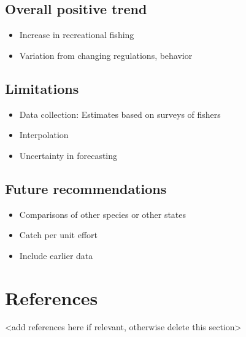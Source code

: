 \documentclass[
  12pt,
]{article}
\providecommand{\tightlist}{%
  \setlength{\itemsep}{0pt}\setlength{\parskip}{0pt}}
\begin{document}
\hypertarget{overall-positive-trend}{%
\subsection{Overall positive trend}\label{overall-positive-trend}}

\begin{itemize}
\tightlist
\item
  Increase in recreational fishing
\item
  Variation from changing regulations, behavior
\end{itemize}

\hypertarget{limitations}{%
\subsection{Limitations}\label{limitations}}

\begin{itemize}
\tightlist
\item
  Data collection: Estimates based on surveys of fishers
\item
  Interpolation
\item
  Uncertainty in forecasting
\end{itemize}

\hypertarget{future-recommendations}{%
\subsection{Future recommendations}\label{future-recommendations}}

\begin{itemize}
\tightlist
\item
  Comparisons of other species or other states
\item
  Catch per unit effort
\item
  Include earlier data
\end{itemize}

\newpage

\hypertarget{references}{%
\section{References}\label{references}}

\textless add references here if relevant, otherwise delete this
section\textgreater{}
\end{document}
